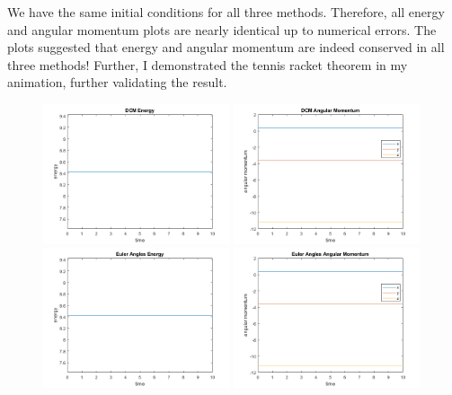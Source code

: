 \documentclass[12pt]{article}
\begin{document}
We have the same initial conditions for all three methods. Therefore, all energy and angular momentum plots are nearly identical up to numerical errors. The plots suggested that energy and angular momentum are indeed conserved in all three methods! Further, I demonstrated the tennis racket theorem in my animation, further validating the result. 
~\begin{figure}[H]
	\centering
	\includegraphics[width=0.49\textwidth]{./figures/sim2.1.png}
	\includegraphics[width=0.49\textwidth]{./figures/sim2.2.png}
	\includegraphics[width=0.49\textwidth]{./figures/sim2.3.png}
	\includegraphics[width=0.49\textwidth]{./figures/sim2.4.png}

\end{figure}
\end{document}
